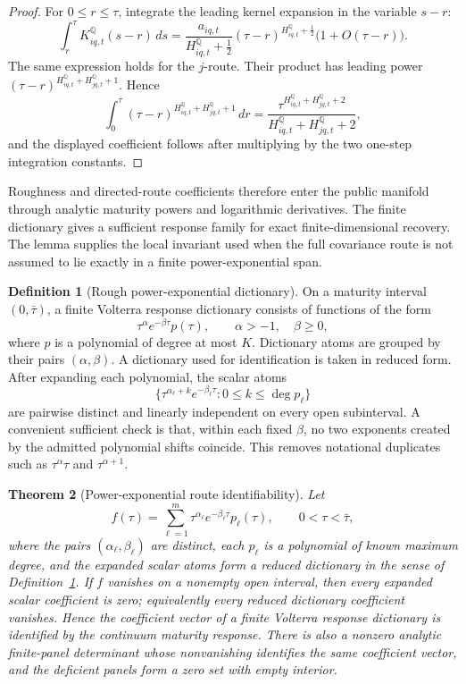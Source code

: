 \documentclass[11pt,a4paper]{amsart}
\theoremstyle{plain}
\newtheorem{theorem}{Theorem}[section]
\theoremstyle{definition}
\newtheorem{definition}[theorem]{Definition}
\theoremstyle{remark}
\newcommand{\QQ}{\mathbb{Q}}
\newcommand{\dd}{\,d}
\begin{document}
\begin{proof}
For \(0\le r\le\tau\), integrate the leading kernel expansion in the variable \(s-r\):
\[
        \int_r^\tau K_{iq,t}^\QQ(s-r)\dd s
        =
        \frac{a_{iq,t}}{H_{iq,t}^\QQ+\frac12}
        (\tau-r)^{H_{iq,t}^\QQ+\frac12}
        \bigl(1+O(\tau-r)\bigr).
\]
The same expression holds for the \(j\)-route.  Their product has leading power
\((\tau-r)^{H_{iq,t}^\QQ+H_{jq,t}^\QQ+1}\).  Hence
\[
        \int_0^\tau
        (\tau-r)^{H_{iq,t}^\QQ+H_{jq,t}^\QQ+1}\dd r
        =
        \frac{\tau^{H_{iq,t}^\QQ+H_{jq,t}^\QQ+2}}
        {H_{iq,t}^\QQ+H_{jq,t}^\QQ+2},
\]
and the displayed coefficient follows after multiplying by the two one-step integration constants.
\end{proof}

Roughness and directed-route coefficients therefore enter the public manifold through analytic
maturity powers and logarithmic derivatives.  The finite dictionary gives a sufficient response
family for exact finite-dimensional recovery.  The lemma supplies the local invariant used when the
full covariance route is not assumed to lie exactly in a finite power-exponential span.

\begin{definition}[Rough power-exponential dictionary]\label{def:rough-power-exponential-dictionary}
On a maturity interval \((0,\bar\tau)\), a finite Volterra response dictionary consists of
functions of the form
\[
        \tau^\alpha e^{-\beta\tau}p(\tau),
        \qquad \alpha>-1,\quad \beta\ge0,
\]
where \(p\) is a polynomial of degree at most \(K\).  Dictionary atoms are grouped by their
pairs \((\alpha,\beta)\).
A dictionary used for identification is taken in reduced form.  After expanding each polynomial,
the scalar atoms
\[
        \{\tau^{\alpha_\ell+k}e^{-\beta_\ell\tau}:0\le k\le\deg p_\ell\}
\]
are pairwise distinct and linearly independent on every open subinterval.  A convenient
sufficient check is that, within each fixed \(\beta\), no two exponents created by the admitted
polynomial shifts coincide.  This removes notational duplicates such as
\(\tau^\alpha\tau\) and \(\tau^{\alpha+1}\).
\end{definition}

\begin{theorem}[Power-exponential route identifiability]\label{thm:power-exponential-identifiability}
Let
\[
        f(\tau)
        =
        \sum_{\ell=1}^m
        \tau^{\alpha_\ell}e^{-\beta_\ell\tau}p_\ell(\tau),
        \qquad 0<\tau<\bar\tau,
\]
where the pairs \((\alpha_\ell,\beta_\ell)\) are distinct, each \(p_\ell\) is a polynomial of
known maximum degree, and the expanded scalar atoms form a reduced dictionary in the sense of
Definition~\ref{def:rough-power-exponential-dictionary}.  If \(f\) vanishes on a nonempty open
interval, then every expanded scalar coefficient is zero; equivalently every reduced dictionary
coefficient vanishes.  Hence the coefficient vector of a finite Volterra response dictionary is
identified by the continuum maturity response.  There is also a nonzero
analytic finite-panel determinant whose nonvanishing identifies the same coefficient vector, and
the deficient panels form a zero set with empty interior.
\end{theorem}
\end{document}
